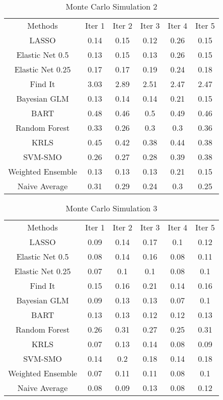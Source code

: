 \documentclass[12pt,letterpaper]{article}
\numberwithin{equation}{section}
\numberwithin{equation}{section}
\begin{document}
\begin{table}[hbt]
\caption{Monte Carlo Simulation 2}
\begin{tabular}{cccccc}
Methods & Iter 1& Iter 2 & Iter 3 & Iter 4 & Iter 5\\
LASSO&0.14&0.15&0.12&0.26&0.15\\ 
Elastic Net 0.5&0.13&0.15&0.13&0.26&0.15\\ 
Elastic Net 0.25&0.17&0.17&0.19&0.24&0.18\\ 
Find It&3.03&2.89&2.51&2.47&2.47\\ 
Bayesian GLM&0.13&0.14&0.14&0.21&0.15\\ 
BART&0.48&0.46&0.5&0.49&0.46\\ 
Random Forest&0.33&0.26&0.3&0.3&0.36\\ 
KRLS&0.45&0.42&0.38&0.44&0.38\\ 
SVM-SMO&0.26&0.27&0.28&0.39&0.38\\ 
Weighted Ensemble&0.13&0.13&0.13&0.21&0.15\\ 
Naive Average&0.31&0.29&0.24&0.3&0.25\\ 
\end{tabular}
\end{table}




\begin{table}[hbt]
\caption{Monte Carlo Simulation 3}
\begin{tabular}{cccccc}
Methods & Iter 1& Iter 2 & Iter 3 & Iter 4 & Iter 5\\
LASSO&0.09&0.14&0.17&0.1&0.12\\ 
Elastic Net 0.5&0.08&0.14&0.16&0.08&0.11\\ 
Elastic Net 0.25&0.07&0.1&0.1&0.08&0.1\\ 
Find It&0.15&0.16&0.21&0.14&0.16\\ 
Bayesian GLM&0.09&0.13&0.13&0.07&0.1\\ 
BART&0.13&0.13&0.12&0.12&0.13\\ 
Random Forest&0.26&0.31&0.27&0.25&0.31\\ 
KRLS&0.07&0.13&0.14&0.08&0.09\\ 
SVM-SMO&0.14&0.2&0.18&0.14&0.18\\ 
Weighted Ensemble&0.07&0.11&0.11&0.08&0.1\\ 
Naive Average&0.08&0.09&0.13&0.08&0.12\\ 
\end{tabular}
\end{table}
\end{document}
